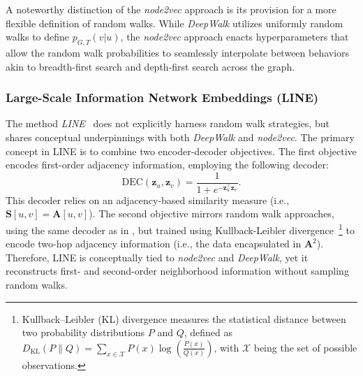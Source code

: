 A noteworthy distinction of the \textit{node2vec} approach is its provision for a more flexible definition of random walks. While \textit{DeepWalk} utilizes uniformly random walks to define $ p_{G,T}(v|u) $, the \textit{node2vec} approach enacts hyperparameters that allow the random walk probabilities to seamlessly interpolate between behaviors akin to breadth-first search and depth-first search across the graph.

\subsubsection{Large-Scale Information Network Embeddings (LINE)}
The method \textit{LINE}~\cite{Tang2015line} does not explicitly harness random walk strategies, but shares conceptual underpinnings with both \textit{DeepWalk} and \textit{node2vec}. The primary concept in LINE is to combine two encoder-decoder objectives. The first objective encodes first-order adjacency information, employing the following decoder:
\begin{equation*}
    \text{DEC}(\mathbf{z}_u, \mathbf{z}_v) = \frac{1}{1 + e^{-\mathbf{z}_u^\top\mathbf{z}_v}}.
\end{equation*}
This decoder relies on an adjacency-based similarity measure (i.e., $ \textbf{S}[u,v] = \mathbf{A}[u,v] $). The second objective mirrors random walk approaches, using the same decoder as in , but trained using Kullback-Leibler divergence~\footnote{Kullback–Leibler (KL) divergence measures the statistical distance between two probability distributions $P$ and $Q$, defined as $ D_{\text{KL}}(P\parallel Q)=\sum_{x\in \mathcal{X}}P(x)\log \left(\frac{P(x)}{Q(x)}\right) $, with $\mathcal{X}$ being the set of possible observations.} to encode two-hop adjacency information (i.e., the data encapsulated in $ \mathbf{A}^2 $). Therefore, LINE is conceptually tied to \textit{node2vec} and \textit{DeepWalk}, yet it reconstructs first- and second-order neighborhood information without sampling random walks.

